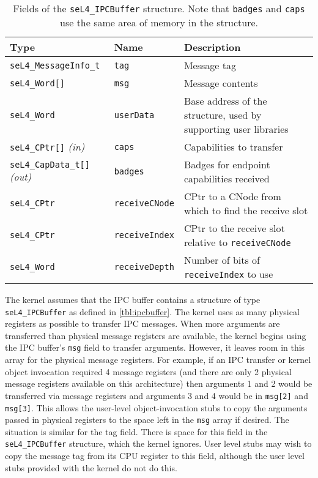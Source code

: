 
\newcommand{\ipcparam}[4]{\texttt{#1} \emph{#2}&\texttt{#3}&#4\\ }
\begin{table}[htb]
    \begin{center}
    \begin{tabularx}{\textwidth}{p{}p{}X}
      \toprule
      \textbf{Type} & \textbf{Name} & \textbf{Description} \\
      \midrule
        \ipcparam{seL4\_MessageInfo\_t}{}{tag}{Message tag}
        \ipcparam{seL4\_Word[]}{}{msg}{Message contents}
        \ipcparam{seL4\_Word}{}{userData}{Base address of the structure, used by
        supporting user libraries}
        \ipcparam{seL4\_CPtr[]}{(in)}{caps}{Capabilities to transfer}
        \ipcparam{seL4\_CapData\_t[]}{(out)}{badges}{Badges for
        endpoint capabilities received}
        \ipcparam{seL4\_CPtr}{}{receiveCNode}{CPtr to a CNode from which to
        find
        the receive slot}
        \ipcparam{seL4\_CPtr}{}{receiveIndex}{CPtr to the receive slot
        relative to \texttt{receiveCNode}}
        \ipcparam{seL4\_Word}{}{receiveDepth}{Number of bits of
        \texttt{receiveIndex} to
        use}
        \bottomrule
      \end{tabularx}
    \caption{\label{tbl:ipcbuffer}Fields of the
      \texttt{seL4\_IPCBuffer} structure.  Note that
      \texttt{badges} and \texttt{caps} use the same area of memory in
      the structure.}
    \end{center}
\end{table}

The kernel assumes that the IPC buffer contains a structure of type
\texttt{seL4\_IPCBuffer} as defined in \autoref{tbl:ipcbuffer}. The
kernel uses as many physical registers as possible to transfer IPC
messages. When more arguments are transferred than physical message
registers are available, the kernel begins using the IPC buffer's
\texttt{msg} field to transfer arguments. However, it leaves room in
this array for the physical message registers. For example, if an IPC
transfer or kernel object invocation required
4 message registers (and there are only 2 physical message registers
available on this architecture) then arguments 1 and 2 would be
transferred via message registers and arguments 3 and 4 would be in
\texttt{msg[2]} and \texttt{msg[3]}.
This allows the user-level object-invocation stubs to copy the arguments passed in physical registers to
the space left in the \texttt{msg} array if desired.
The situation is similar for the tag field.
There is space for this field in the \texttt{seL4\_IPCBuffer} structure, which the kernel ignores.
User level stubs
may wish to copy the message tag from its CPU register to this field, although
the user level stubs provided with the kernel do not do this.

